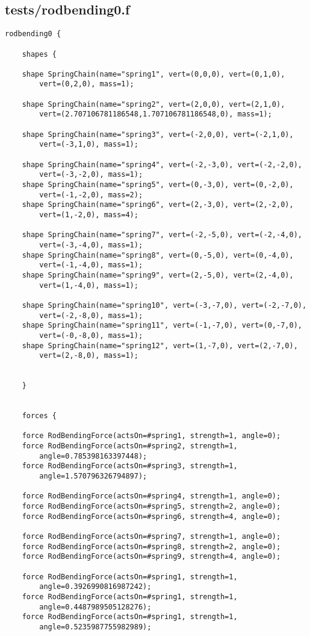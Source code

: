 \subsection*{tests/rodbending0.f}
\begin{lstlisting}
rodbending0 {

    shapes {

	shape SpringChain(name="spring1", vert=(0,0,0), vert=(0,1,0),
		vert=(0,2,0), mass=1);

	shape SpringChain(name="spring2", vert=(2,0,0), vert=(2,1,0),
		vert=(2.707106781186548,1.707106781186548,0), mass=1);

	shape SpringChain(name="spring3", vert=(-2,0,0), vert=(-2,1,0),
		vert=(-3,1,0), mass=1);

	shape SpringChain(name="spring4", vert=(-2,-3,0), vert=(-2,-2,0),
		vert=(-3,-2,0), mass=1);
	shape SpringChain(name="spring5", vert=(0,-3,0), vert=(0,-2,0),
		vert=(-1,-2,0), mass=2);
	shape SpringChain(name="spring6", vert=(2,-3,0), vert=(2,-2,0),
		vert=(1,-2,0), mass=4);

	shape SpringChain(name="spring7", vert=(-2,-5,0), vert=(-2,-4,0),
		vert=(-3,-4,0), mass=1);
	shape SpringChain(name="spring8", vert=(0,-5,0), vert=(0,-4,0),
		vert=(-1,-4,0), mass=1);
	shape SpringChain(name="spring9", vert=(2,-5,0), vert=(2,-4,0),
		vert=(1,-4,0), mass=1);

	shape SpringChain(name="spring10", vert=(-3,-7,0), vert=(-2,-7,0),
		vert=(-2,-8,0), mass=1);
	shape SpringChain(name="spring11", vert=(-1,-7,0), vert=(0,-7,0),
		vert=(-0,-8,0), mass=1);
	shape SpringChain(name="spring12", vert=(1,-7,0), vert=(2,-7,0),
		vert=(2,-8,0), mass=1);

	
    }


    forces {
	
	force RodBendingForce(actsOn=#spring1, strength=1, angle=0);
	force RodBendingForce(actsOn=#spring2, strength=1,
		angle=0.785398163397448);
	force RodBendingForce(actsOn=#spring3, strength=1,
		angle=1.570796326794897);

	force RodBendingForce(actsOn=#spring4, strength=1, angle=0);
	force RodBendingForce(actsOn=#spring5, strength=2, angle=0);
	force RodBendingForce(actsOn=#spring6, strength=4, angle=0);

	force RodBendingForce(actsOn=#spring7, strength=1, angle=0);
	force RodBendingForce(actsOn=#spring8, strength=2, angle=0);
	force RodBendingForce(actsOn=#spring9, strength=4, angle=0);

	force RodBendingForce(actsOn=#spring1, strength=1,
		angle=0.3926990816987242);
	force RodBendingForce(actsOn=#spring1, strength=1,
		angle=0.4487989505128276);
	force RodBendingForce(actsOn=#spring1, strength=1,
		angle=0.5235987755982989);



\end{lstlisting}
